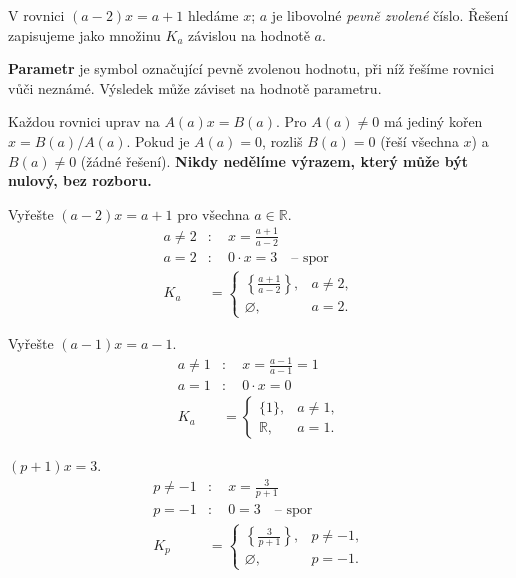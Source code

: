 \documentclass[11pt,a4paper]{article}
\begin{document}
V rovnici $(a-2)x=a+1$ hledáme $x$; $a$ je libovolné \emph{pevně zvolené} číslo. Řešení zapisujeme jako množinu $K_a$ závislou na hodnotě $a$.
\begin{definiceBox}[title={Definice - Parametr}]
\textbf{Parametr} je symbol označující pevně zvolenou hodnotu, při níž řešíme rovnici vůči neznámé. Výsledek může záviset na hodnotě parametru.
\end{definiceBox}
Každou rovnici uprav na $A(a)x=B(a)$. Pro $A(a)\ne0$ má jediný kořen $x=B(a)/A(a)$. Pokud je $A(a)=0$, rozliš $B(a)=0$ (řeší všechna $x$) a $B(a)\ne0$ (žádné řešení). \textbf{Nikdy nedělíme výrazem, který může být nulový, bez rozboru.}
\begin{prikladReseniBox}[title={Příklad 1}]
Vyřešte $(a-2)x=a+1$ pro všechna $a\in\mathbb R$.
\tcblower
\[\begin{aligned}
a\ne2&:\quad x=\frac{a+1}{a-2} \\
a=2&:\quad 0\cdot x=3\quad\text{-- spor} \\
K_a&=\begin{cases}\left\{\frac{a+1}{a-2}\right\},&a\ne2,\\\varnothing,&a=2.\end{cases}
\end{aligned}\]

\end{prikladReseniBox}
\begin{prikladReseniBox}[title={Příklad 2}]
Vyřešte $(a-1)x=a-1$.
\tcblower
\[\begin{aligned}
a\ne1&:\quad x=\frac{a-1}{a-1}=1 \\
a=1&:\quad 0\cdot x=0 \\
K_a&=\begin{cases}\{1\},&a\ne1,\\\mathbb R,&a=1.\end{cases}
\end{aligned}\]

\end{prikladReseniBox}
\begin{zadaniReseniBox}[title={Samostatná práce 1}]
$(p+1)x=3$.
\tcblower
\[\begin{aligned}
p\ne-1&:\quad x=\frac3{p+1} \\
p=-1&:\quad 0=3\quad\text{-- spor} \\
K_p&=\begin{cases}\left\{\frac3{p+1}\right\},&p\ne-1,\\\varnothing,&p=-1.\end{cases}
\end{aligned}\]

\end{zadaniReseniBox}
\end{document}
